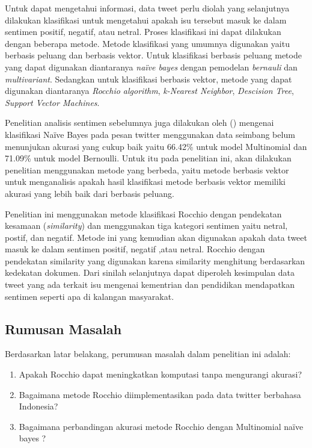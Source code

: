 Untuk dapat mengetahui informasi, data tweet perlu diolah yang selanjutnya dilakukan klasifikasi untuk mengetahui apakah isu tersebut masuk ke dalam sentimen positif, negatif, atau netral. Proses klasifikasi ini dapat dilakukan dengan beberapa metode. Metode klasifikasi yang umumnya digunakan yaitu berbasis peluang dan berbasis vektor. Untuk klasifikasi berbasis peluang metode yang dapat digunakan diantaranya \textit{naïve bayes} dengan pemodelan \textit{bernauli} dan \textit{multivariant}. Sedangkan untuk klasifikasi berbasis vektor, metode yang dapat digunakan diantaranya \textit{Rocchio algorithm}, \textit{k-Nearest Neighbor}, \textit{Descision Tree}, \textit{Support Vector Machines}.

Penelitian analisis sentimen sebelumnya juga dilakukan oleh \citeauthor{ADITYAWAN2014} (\cite*{ADITYAWAN2014}) mengenai klasifikasi Naïve Bayes pada pesan twitter menggunakan data seimbang belum menunjukan akurasi yang cukup baik yaitu 66.42\% untuk model Multinomial dan 71.09\% untuk model Bernoulli. Untuk itu pada penelitian ini, akan dilakukan penelitian menggunakan metode yang berbeda, yaitu metode berbasis vektor untuk menganalisis apakah hasil klasifikasi metode berbasis vektor memiliki akurasi yang lebih baik dari berbasis peluang. 

Penelitian ini menggunakan metode klasifikasi Rocchio dengan pendekatan kesamaan (\textit{similarity}) dan menggunakan tiga kategori sentimen yaitu netral, postif, dan negatif. Metode ini yang kemudian akan digunakan apakah data tweet masuk ke dalam sentimen positif, negatif ,atau netral. Rocchio dengan pendekatan similarity yang digunakan  karena similarity menghitung berdasarkan kedekatan dokumen. Dari sinilah selanjutnya dapat diperoleh kesimpulan data tweet yang ada terkait isu mengenai kementrian dan pendidikan mendapatkan sentimen seperti apa di kalangan masyarakat. 


\subsection*{Rumusan Masalah}
Berdasarkan latar belakang, perumusan masalah dalam penelitian ini adalah: 
\begin{enumerate}[noitemsep] 
	\item Apakah Rocchio dapat meningkatkan komputasi tanpa mengurangi akurasi?
	\item Bagaimana metode Rocchio diimplementasikan pada data twitter berbahasa Indonesia?
	\item Bagaimana perbandingan akurasi metode Rocchio dengan Multinomial naïve bayes ?
\end{enumerate}

